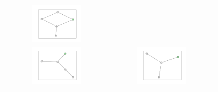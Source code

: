 \documentclass[12pt, a4paper]{extarticle}
\begin{document}
\begin{figure}
\begin{tabularx}{\textwidth}{cc}
\includegraphics[width=0.5\textwidth]{task11-graphlets/5_16-18-22-23-24.pdf} \\
\includegraphics[width=0.5\textwidth]{task11-graphlets/5_14-16-21-22-23.pdf} &
\includegraphics[width=0.5\textwidth]{task11-graphlets/4_14-21-20-23.pdf} \\
\end{tabularx}\end{figure}
\end{document}
